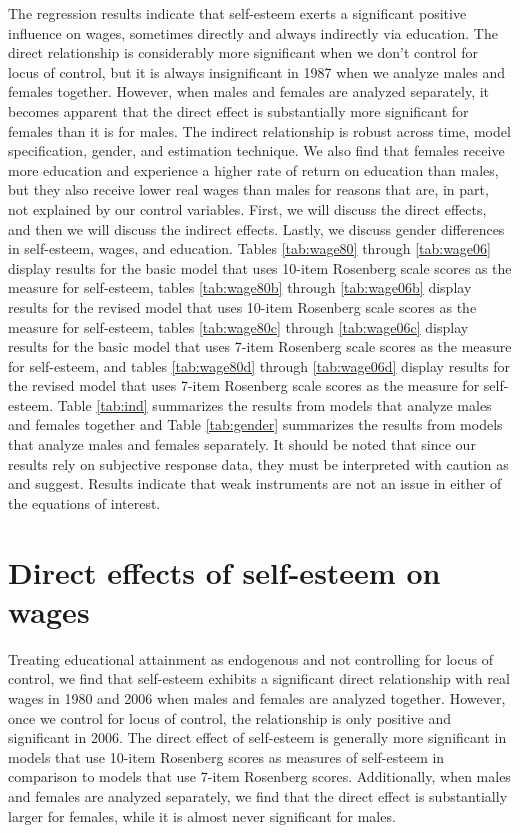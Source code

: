 \documentclass[12pt]{report}
\newcommand{\citee}[1]{\citename{#1} \citeyear{#1}}
\begin{document}
The regression results indicate that self-esteem exerts a significant positive influence on wages, sometimes directly and always indirectly via education. The direct relationship is considerably more significant when we don't control for locus of control, but it is always insignificant in 1987 when we analyze males and females together. However, when males and females are analyzed separately, it becomes apparent that the direct effect is substantially more significant for females than it is for males. The indirect relationship is robust across time, model specification, gender, and estimation technique. We also find that females receive more education and experience a higher rate of return on education than males, but they also receive lower real wages than males for reasons that are, in part, not explained by our control variables. First, we will discuss the direct effects, and then we will discuss the indirect effects. Lastly, we discuss gender differences in self-esteem, wages, and education. Tables \ref{tab:wage80} through \ref{tab:wage06} display results for the basic model that uses 10-item Rosenberg scale scores as the measure for self-esteem, tables \ref{tab:wage80b} through \ref{tab:wage06b} display results for the revised model that uses 10-item Rosenberg scale scores as the measure for self-esteem, tables \ref{tab:wage80c}  through \ref{tab:wage06c} display results for the basic model that uses 7-item Rosenberg scale scores as the measure for self-esteem, and tables \ref{tab:wage80d} through \ref{tab:wage06d} display results for the revised model that uses 7-item Rosenberg scale scores as the measure for self-esteem. Table \ref{tab:ind} summarizes the results from models that analyze males and females together and Table \ref{tab:gender} summarizes the results from models that analyze males and females separately. It should be noted that since our results rely on subjective response data, they must be interpreted with caution as \citee{F1978} and \citee{BM2001} suggest. Results indicate that weak instruments are not an issue in either of the equations of interest.

\section*{Direct effects of self-esteem on wages}

Treating educational attainment as endogenous and not controlling for locus of control, we find that self-esteem exhibits a significant direct relationship with real wages in 1980 and 2006 when males and females are analyzed together. However, once we control for locus of control, the relationship is only positive and significant in 2006. The direct effect of self-esteem is generally more significant in models that use 10-item Rosenberg scores as measures of self-esteem in comparison to models that use 7-item Rosenberg scores. Additionally, when males and females are analyzed separately, we find that the direct effect is substantially larger for females, while it is almost never significant for males.
\end{document}
